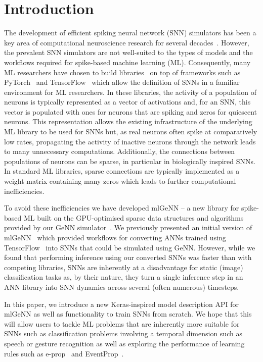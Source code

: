 \documentclass[sigconf]{acmart}
\begin{document}
\section{Introduction}
The development of efficient spiking neural network (SNN) simulators has been a key area of computational neuroscience research for several decades~\citep{carnevale2006neuron, Gewaltig2007, Golosio2021, Akar2019,Yavuz2016}.
However, the prevalent SNN simulators are not well-suited to the types of models and the workflows required for spike-based machine learning (ML).
Consequently, many ML researchers have chosen to build libraries~\citep{norse2021, SpikingJelly,eshraghian2021training,Hazan2018,zhao_neko_2021} on top of frameworks such as PyTorch~\citep{paszke2019pytorch} and TensorFlow~\citep{TensorFlow} which allow the definition of SNNs in a familiar environment for ML researchers.
In these libraries, the activity of a population of neurons is typically represented as a vector of activations and, for an SNN, this vector is populated with ones for neurons that are spiking and zeros for quiescent neurons. 
This representation allows the existing infrastructure of the underlying ML library to be used for SNNs but, as real neurons often spike at comparatively low rates, propagating the activity of inactive neurons through the network leads to many unnecessary computations.
Additionally, the connections between populations of neurons can be sparse, in particular in biologically inspired SNNs. In standard ML libraries, sparse connections are typically implemented as a weight matrix containing many zeros which leads to further computational inefficiencies.

To avoid these inefficiencies we have developed mlGeNN -- a new library for spike-based ML built on the GPU-optimised sparse data structures and algorithms provided by our GeNN simulator~\citep{Yavuz2016,Knight2018,Knight2021}.
We previously presented an initial version of mlGeNN~\citep{Turner2022} which provided workflows for converting ANNs trained using TensorFlow~\citep{TensorFlow} into SNNs that could be simulated using GeNN.
However, while we found that performing inference using our converted SNNs was faster than with competing libraries, SNNs are inherently at a disadvantage for static (image) classification tasks as, by their nature, they turn a single inference step in an ANN library into SNN dynamics across several (often numerous) timesteps.

In this paper, we introduce a new Keras-inspired model description API for mlGeNN as well as functionality to train SNNs from scratch.
We hope that this will allow users to tackle ML problems that are inherently more suitable for SNNs such as classification problems involving a temporal dimension such as speech or gesture recognition as well as exploring the performance of learning rules such as e-prop~\citep{Bellec2020} and EventProp~\citep{Wunderlich2021}.
\end{document}
